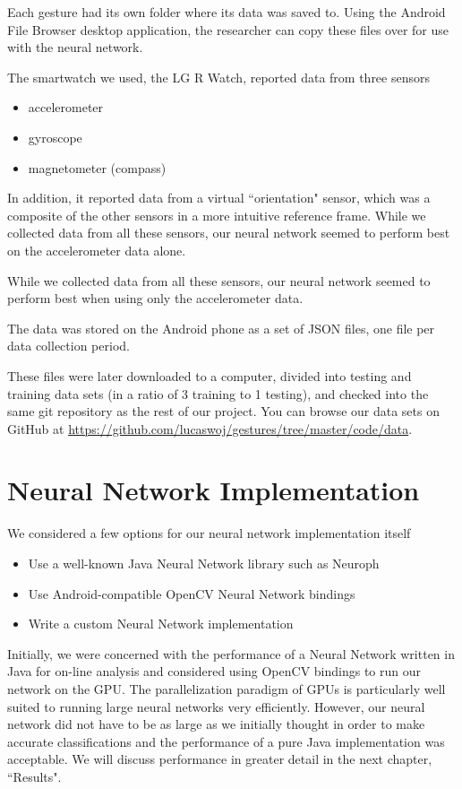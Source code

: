 \documentclass{report}
\begin{document}
Each gesture had its own folder where its data was saved to. Using the Android File Browser desktop application, the researcher can copy these files over for use with the neural network.

The smartwatch we used, the LG R Watch, reported data from three sensors
\begin{itemize}
\item accelerometer
\item gyroscope
\item magnetometer (compass)
\end{itemize}
In addition, it reported data from a virtual ``orientation" sensor, which was a composite of the other sensors in a more intuitive reference frame. While we collected data from all these sensors, our neural network seemed to perform best on the accelerometer data alone.

While we collected data from all these sensors, our neural network seemed to perform best when using only the accelerometer data.

The data was stored on the Android phone as a set of JSON files, one file per data collection period. %

These files were later downloaded to a computer, divided into testing and training data sets (in a ratio of 3 training to 1 testing), and checked into the same git repository as the rest of our project. You can browse our data sets on GitHub at \url{https://github.com/lucaswoj/gestures/tree/master/code/data}.

\section{Neural Network Implementation}

We considered a few options for our neural network implementation itself
\begin{itemize}
\item Use a well-known Java Neural Network library such as Neuroph
\item Use Android-compatible OpenCV Neural Network bindings
\item Write a custom Neural Network implementation
\end{itemize}

Initially, we were concerned with the performance of a Neural Network written in Java for on-line analysis and considered using OpenCV bindings to run our network on the GPU. The parallelization paradigm of GPUs is particularly well suited to running large neural networks very efficiently. However, our neural network did not have to be as large as we initially thought in order to make accurate classifications and the performance of a pure Java implementation was acceptable. We will discuss performance in greater detail in the next chapter, ``Results".
\end{document}
